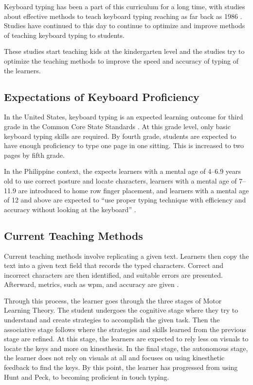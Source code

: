 \documentclass{report}
\begin{document}
Keyboard typing has been a part of this curriculum for a long time, with studies
about effective methods to teach keyboard typing reaching as far back as 1986
\parencite{hoot1986}. Studies have continued to this day to continue to optimize
and improve methods of teaching keyboard typing to students.

These studies start teaching kids at the kindergarten level and the studies try
to optimize the teaching methods to improve the speed and accuracy of typing of
the learners.

\subsection{Expectations of Keyboard Proficiency}

In the United States, keyboard typing is an expected learning outcome for third
grade in the Common Core State Standards \parencite{ccs}. At this grade level,
only basic keyboard typing skills are required. By fourth grade, students are
expected to have enough proficiency to type one page in one sitting. This is
increased to two pages by fifth grade.

In the Philippine context, the \citeauthor{deped} expects learners with a mental
age of 4--6.9 years old to use correct posture and locate characters, learners
with a mental age of 7--11.9 are introduced to home row finger placement, and
learners with a mental age of 12 and above are expected to ``use proper typing
technique with efficiency and accuracy without looking at the keyboard''
\parencite{deped}.

\subsection{Current Teaching Methods}

Current teaching methods involve replicating a given text. Learners then copy
the text into a given text field that records the typed characters. Correct and
incorrect characters are then identified, and suitable errors are presented.
Afterward, metrics, such as \ac{wpm}, and accuracy are given
\parencite{bartnik2021, typeracer}.

Through this process, the learner goes through the three stages of Motor
Learning Theory. The student undergoes the cognitive stage where they try to
understand and create strategies to accomplish the given task. Then the
associative stage follows where the strategies and skills learned from the
previous stage are refined. At this stage, the learners are expected to rely less
on visuals to locate the keys and more on kinesthesis. In the final stage, the
autonomous stage, the learner does not rely on visuals at all and focuses on
using kinesthetic feedback to find the keys. By this point, the learner has
progressed from using Hunt and Peck, to becoming proficient in touch typing.
\parencite{donica2018}
\end{document}
